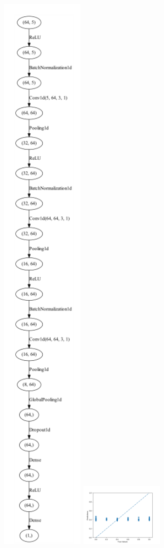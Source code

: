 \documentclass[a4paper]{report}
\begin{document}
\includegraphics[width=0.3\textwidth,height=0.3\textheight,keepaspectratio]{img/10/NAS/nas_model.png}
\includegraphics[width=0.3\textwidth,height=0.3\textheight,keepaspectratio]{img/10/NAS/predictions.png}



\end{document}
